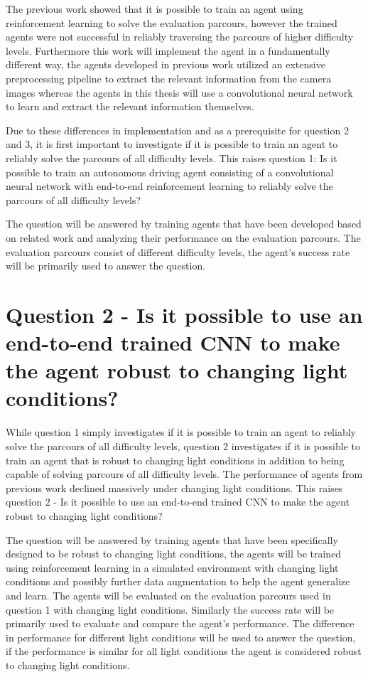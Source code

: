 The previous work \autocite{maximilian} showed that it is possible to train an agent using reinforcement learning to solve the evaluation parcours, however the trained agents were not successful in reliably traversing the parcours of higher difficulty levels. Furthermore this work will implement the agent in a fundamentally different way, the agents developed in previous work utilized an extensive preprocessing pipeline to extract the relevant information from the camera images whereas the agents in this thesis will use a convolutional neural network to learn and extract the relevant information themselves.

Due to these differences in implementation and as a prerequisite for question 2 and 3, it is first important to investigate if it is possible to train an agent to reliably solve the parcours of all difficulty levels. This raises question 1:
Is it possible to train an autonomous driving agent consisting of a convolutional neural network with end-to-end reinforcement learning to reliably solve the parcours of all difficulty levels?

The question will be answered by training agents that have been developed based on related work and analyzing their performance on the evaluation parcours. The evaluation parcours consist of different difficulty levels, the agent's success rate will be primarily used to answer the question.


\section{Question 2 - Is it possible to use an end-to-end trained CNN to make the agent robust to changing light conditions?}

While question 1 simply investigates if it is possible to train an agent to reliably solve the parcours of all difficulty levels, question 2 investigates if it is possible to train an agent that is robust to changing light conditions in addition to being capable of solving parcours of all difficulty levels. The performance of agents from previous work \autocite{maximilian} declined massively under changing light conditions. This raises question 2 - Is it possible to use an end-to-end trained CNN to make the agent robust to changing light conditions?

The question will be answered by training agents that have been specifically designed to be robust to changing light conditions, the agents will be trained using reinforcement learning in a simulated environment with changing light conditions and possibly further data augmentation to help the agent generalize and learn. The agents will be evaluated on the evaluation parcours used in question 1 with changing light conditions. Similarly the success rate will be primarily used to evaluate and compare the agent's performance. The difference in performance for different light conditions will be used to answer the question, if the performance is similar for all light conditions the agent is considered robust to changing light conditions.

